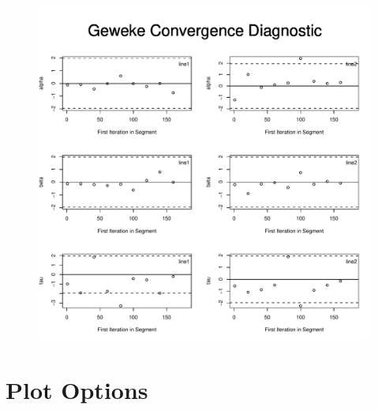 \documentclass[12pt,letterpaper]{report}
\begin{document}
\begin{figure}[h]
\centering
\includegraphics[keepaspectratio,width=5in]{geweke.pdf}
\end{figure}

\pagebreak

\section{Plot Options}
\label{sec.plotpar}
\noindent
\end{document}
